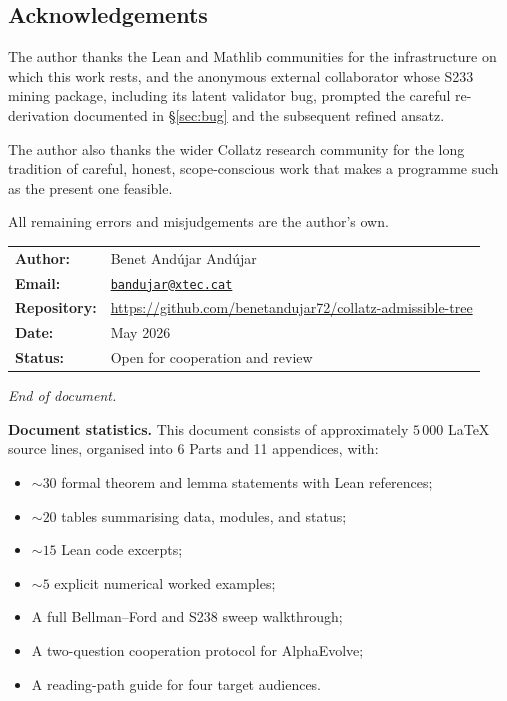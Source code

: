 \documentclass[11pt,a4paper]{article}
\theoremstyle{plain}
\theoremstyle{definition}
\begin{document}
\subsection*{Acknowledgements}

The author thanks the Lean and Mathlib communities for the
infrastructure on which this work rests, and the anonymous
external collaborator whose S233 mining package, including its
latent validator bug, prompted the careful re-derivation
documented in \S\ref{sec:bug} and the subsequent refined ansatz.

The author also thanks the wider Collatz research community for
the long tradition of careful, honest, scope-conscious work that
makes a programme such as the present one feasible.

All remaining errors and misjudgements are the author's own.

\bigskip
\noindent\hrulefill\par
\smallskip\noindent
\begin{tabular}{ll}
\textbf{Author:}     & Benet Andújar Andújar \\
\textbf{Email:}      & \href{mailto:bandujar@xtec.cat}{\texttt{bandujar@xtec.cat}} \\
\textbf{Repository:} & \url{https://github.com/benetandujar72/collatz-admissible-tree} \\
\textbf{Date:}       & May 2026 \\
\textbf{Status:}     & Open for cooperation and review \\
\end{tabular}

\bigskip
\noindent\hrulefill\par
\smallskip\noindent
\textit{End of document.}

\bigskip
\noindent\hrulefill\par
\smallskip\noindent
\textbf{Document statistics.}
This document consists of approximately $5\,000$ LaTeX source
lines, organised into 6 Parts and 11 appendices, with:
\begin{itemize}
   \item ${\sim} 30$ formal theorem and lemma statements
         with Lean references;
   \item ${\sim} 20$ tables summarising data, modules, and
         status;
   \item ${\sim} 15$ Lean code excerpts;
   \item ${\sim} 5$ explicit numerical worked examples;
   \item A full Bellman--Ford and S238 sweep walkthrough;
   \item A two-question cooperation protocol for AlphaEvolve;
   \item A reading-path guide for four target audiences.
\end{itemize}
\end{document}
